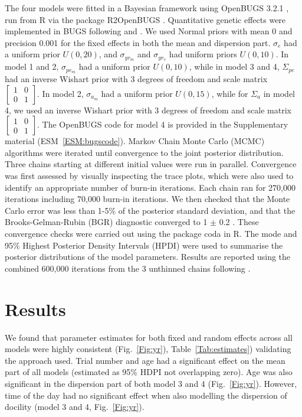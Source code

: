 \documentclass[a4paper,12pt,twoside]{article}
\begin{document}
	The four models were fitted in a Bayesian framework using OpenBUGS 3.2.1 \citep{Thomas2006}, run from R \citep{RDevelopmentCoreTeam2014} via the package R2OpenBUGS \cite{Sturtz2005}. Quantitative genetic effects were implemented in BUGS following \cite{Waldmann2009} and \cite{Gorjanc2010}.
	We used Normal priors with mean 0 and precision 0.001 for the fixed effects in both the mean and dispersion part.
	$\sigma_e$ had a uniform prior $U(0,20)$, and $\sigma_{yr_m}$ and $\sigma_{yr_v}$ had uniform priors $U(0,10)$.
	In model 1 and 2, $\sigma_{pe_m}$ had a uniform prior $U(0,10)$, while in model 3 and 4, $\Sigma_{pe}$ had an inverse Wishart prior with 3 degrees of freedom and scale matrix $\begin{bmatrix} 1 & 0 \\ 0 & 1 \end{bmatrix}$.
	In model 2, $\sigma_{a_m}$ had a uniform prior $U(0,15)$, while for $\Sigma_{a}$ in model 4, we used an inverse Wishart prior with 3 degrees of freedom and scale matrix $\begin{bmatrix} 1 & 0 \\ 0 & 1 \end{bmatrix}$.
	The OpenBUGS code for model 4 is provided in the Supplementary material (ESM~\ref{ESM:bugscode}).
	Markov Chain Monte Carlo (MCMC) algorithms were iterated until convergence to the joint posterior distribution.
	Three chains starting at different initial values were run in parallel.
	Convergence was first assessed by visually inspecting the trace plots, which were also used to identify an appropriate number of burn-in iterations. 
	Each chain ran for 270,000 iterations including 70,000 burn-in iterations.
	We then checked that the Monte Carlo error was less than 1-5\% of the posterior standard deviation, and that the Brooks-Gelman-Rubin (BGR) diagnostic converged to 1 $\pm$ 0.2 \cite{Gilks1995}.
	These convergence checks were carried out using the package coda \citep{Plummer2006} in R.
	The mode and 95\% Highest Posterior Density Intervals (HPDI) were used to summarise the posterior distributions of the model parameters. 
	Results are reported using the combined 600,000 iterations from the 3 unthinned chains following \citep{Link2012,Kruschke2014}.
	
	\section*{Results}
	We found that parameter estimates for both fixed and random effects across all models were highly consistent (Fig.~\ref{Fig:yr}), Table~\ref{Tab:estimates}) validating the approach used.
	Trial number and age had a significant effect on the mean part of all models (estimated as 95\% HDPI not overlapping zero). Age was also significant in the dispersion part of both model 3 and 4 (Fig.~\ref{Fig:yr}).
	However, time of the day had no significant effect when also modelling the dispersion of docility (model 3 and 4, Fig.~\ref{Fig:yr}).
	
\end{document}
